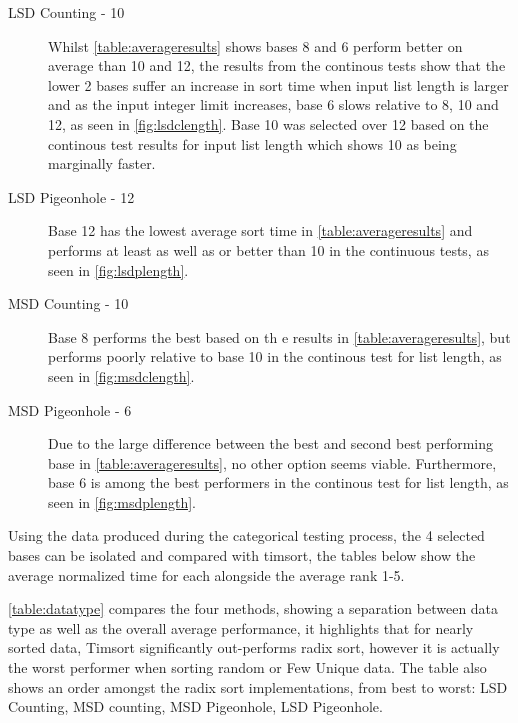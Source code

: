 \documentclass[12pt]{article}
\begin{document}
	\begin{description}
		\item[LSD Counting - 10] Whilst \autoref{table:averageresults} shows bases 8 and 6 perform better on average than 10 and 12, the results from the continous tests show that the lower 2 bases suffer an increase in sort time when input list length is larger and as the input integer limit increases, base 6 slows relative to 8, 10 and 12, as seen in \autoref{fig:lsdclength}. Base 10 was selected over 12 based on the continous test results for input list length which shows 10 as being marginally faster.		
		\item[LSD Pigeonhole - 12] Base 12 has the lowest average sort time in \autoref{table:averageresults} and performs at least as well as or better than 10 in the continuous tests, as seen in \autoref{fig:lsdplength}.
		\item[MSD Counting - 10] Base 8 performs the best based on th e results in \autoref{table:averageresults}, but performs poorly relative to base 10 in the continous test for list length, as seen in \autoref{fig:msdclength}.
		\item[MSD Pigeonhole - 6] Due to the large difference between the best and second best performing base in \autoref{table:averageresults}, no other option seems viable. Furthermore, base 6 is among the best performers in the continous test for list length, as seen in \autoref{fig:msdplength}.
	\end{description}
	\par
	Using the data produced during the categorical testing process, the 4 selected bases can be isolated and compared with timsort, the tables below show the average normalized time for each alongside the average rank 1-5.
	\par
	\autoref{table:datatype} compares the four methods, showing a separation between data type as well as the overall average performance, it highlights that for nearly sorted data, Timsort significantly out-performs radix sort, however it is actually the worst performer when sorting random or Few Unique data. The table also shows an order amongst the radix sort implementations, from best to worst: LSD Counting, MSD counting, MSD Pigeonhole, LSD Pigeonhole.
\end{document}

